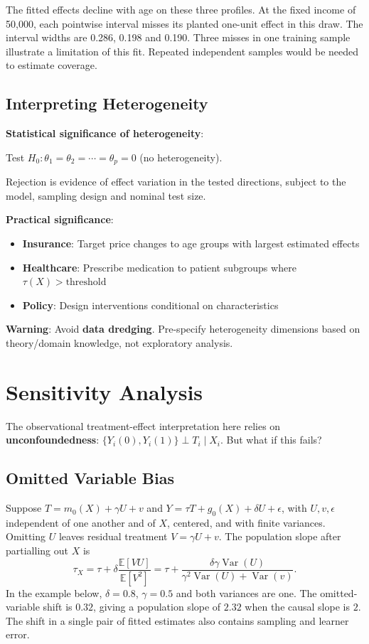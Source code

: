 The fitted effects decline with age on these three profiles. At the fixed income of 50,000, each pointwise interval misses its planted one-unit effect in this draw. The interval widths are 0.286, 0.198 and 0.190. Three misses in one training sample illustrate a limitation of this fit. Repeated independent samples would be needed to estimate coverage.

\subsection{Interpreting
Heterogeneity}\label{_interpreting_heterogeneity}

\textbf{Statistical significance of heterogeneity}:

Test \(H_0: \theta_1 = \theta_2 = \cdots = \theta_p = 0\) (no
heterogeneity).

Rejection is evidence of effect variation in the tested directions, subject to the model, sampling design and nominal test size.

\textbf{Practical significance}:

\begin{itemize}
\item
  \textbf{Insurance}: Target price changes to age groups with largest
  estimated effects
\item
  \textbf{Healthcare}: Prescribe medication to patient subgroups where
  \(\tau(X) > \text{threshold}\)
\item
  \textbf{Policy}: Design interventions conditional on characteristics
\end{itemize}

\textbf{Warning}: Avoid \textbf{data dredging}. Pre-specify
heterogeneity dimensions based on theory/domain knowledge, not
exploratory analysis.

\section{Sensitivity Analysis}\label{_sensitivity_analysis}

The observational treatment-effect interpretation here relies on \textbf{unconfoundedness}:
\(\{Y_i(0), Y_i(1)\} \perp T_i \mid X_i\). But what if this fails?

\subsection{Omitted Variable Bias}\label{_omitted_variable_bias}

Suppose \(T=m_0(X)+\gamma U+v\) and \(Y=\tau T+g_0(X)+\delta U+\epsilon\), with \(U,v,\epsilon\) independent of one another and of \(X\), centered, and with finite variances. Omitting \(U\) leaves residual treatment \(V=\gamma U+v\). The population slope after partialling out \(X\) is
\[
\tau_X=\tau+\delta\frac{\mathbb E[VU]}{\mathbb E[V^2]}
      =\tau+\frac{\delta\gamma\operatorname{Var}(U)}
                   {\gamma^2\operatorname{Var}(U)+\operatorname{Var}(v)}.
\]
In the example below, \(\delta=0.8\), \(\gamma=0.5\) and both variances are one. The omitted-variable shift is \(0.32\), giving a population slope of \(2.32\) when the causal slope is \(2\). The shift in a single pair of fitted estimates also contains sampling and learner error.

